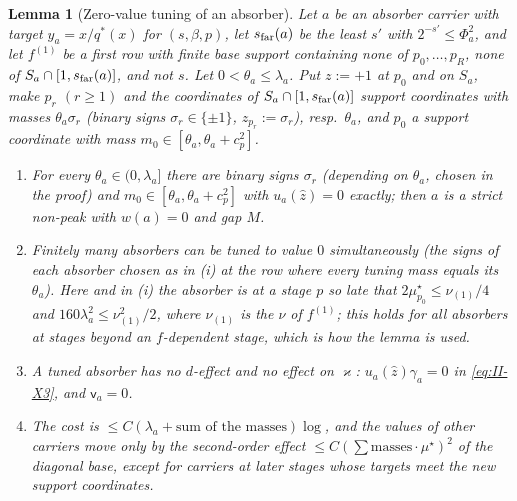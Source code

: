 \documentclass[10pt]{amsart}
\newtheorem{lemma}[theorem]{Lemma}
\theoremstyle{definition}
\theoremstyle{remark}
\newcommand{\zh}{\hat z}
\begin{document}
\begin{lemma}[Zero-value tuning of an absorber]\label{lem:II-zerovalue}
Let $a$ be an absorber carrier with target $y_a=x/q^*(x)$ for $(s,\beta,p)$, let
$s_{\rm far}(a)$ be the least $s'$ with $2^{-s'}\le\Phi_a^2$, and let $f^{(1)}$ be a
first row with finite base support containing none of $p_0,\dots,p_R$, none of
$S_a\cap[1,s_{\rm far}(a)]$, and not $s$.  Let $0<\theta_a\le\lambda_a$.  Put
$z:=+1$ at $p_0$ and on $S_a$, make $p_r$ $(r\ge1)$ and the coordinates of
$S_a\cap[1,s_{\rm far}(a)]$ support coordinates with masses $\theta_a\sigma_r$
(binary signs $\sigma_r\in\{\pm1\}$, $z_{p_r}:=\sigma_r$), resp.\ $\theta_a$, and
$p_0$ a support coordinate with mass $m_0\in[\theta_a,\theta_a+c_p^2]$.
\begin{enumerate}
\item[(i)] For every $\theta_a\in(0,\lambda_a]$ there are binary signs $\sigma_r$
\textup{(}depending on $\theta_a$, chosen in the proof\textup{)} and $m_0\in
[\theta_a,\theta_a+c_p^2]$ with $u_a(\zh)=0$ exactly; then $a$ is a strict
non-peak with $w(a)=0$ and gap $M$.
\item[(ii)] Finitely many absorbers can be tuned to value $0$ simultaneously
\textup{(}the signs of each absorber chosen as in \textup{(i)} at the row
where every tuning mass equals its $\theta_a$\textup{)}.  Here and in
\textup{(i)} the absorber is at a stage $p$ so late that $2\mu^\star_{p_0}\le
\nu_{(1)}/4$ and $160\lambda_a^2\le\nu_{(1)}^2/2$, where $\nu_{(1)}$ is the
$\nu$ of $f^{(1)}$; this holds for all absorbers at stages beyond an
$f$-dependent stage, which is how the lemma is used.
\item[(iii)] A tuned absorber has no $d$-effect and no effect on $\varkappa$:
$u_a(\zh)\gamma_a=0$ in \eqref{eq:II-X3}, and $\mathsf v_a=0$.
\item[(iv)] The cost is $\le C(\lambda_a+\text{sum of the masses})\log$, and the
values of other carriers move only by the second-order effect $\le C(\sum
\text{masses}\cdot\mu^\star)^2$ of the diagonal base, except for carriers at later
stages whose targets meet the new support coordinates.
\end{enumerate}
\end{lemma}
\end{document}
